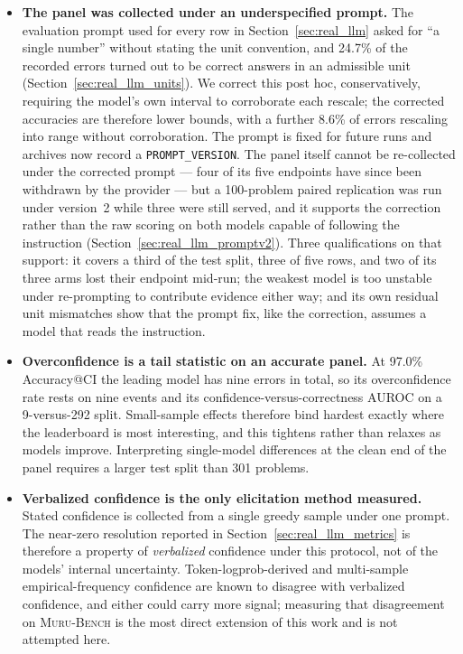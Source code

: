 \documentclass{article}
\newcommand{\muru}{\textsc{Muru-Bench}}
\begin{document}
\begin{itemize}[leftmargin=*,itemsep=3pt]
    \item \textbf{The panel was collected under an underspecified prompt.} The evaluation prompt used for every row in Section~\ref{sec:real_llm} asked for ``a single number'' without stating the unit convention, and 24.7\% of the recorded errors turned out to be correct answers in an admissible unit (Section~\ref{sec:real_llm_units}). We correct this post hoc, conservatively, requiring the model's own interval to corroborate each rescale; the corrected accuracies are therefore lower bounds, with a further 8.6\% of errors rescaling into range without corroboration. The prompt is fixed for future runs and archives now record a \texttt{PROMPT\_VERSION}. The panel itself cannot be re-collected under the corrected prompt --- four of its five endpoints have since been withdrawn by the provider --- but a 100-problem paired replication was run under version~2 while three were still served, and it supports the correction rather than the raw scoring on both models capable of following the instruction (Section~\ref{sec:real_llm_promptv2}). Three qualifications on that support: it covers a third of the test split, three of five rows, and two of its three arms lost their endpoint mid-run; the weakest model is too unstable under re-prompting to contribute evidence either way; and its own residual unit mismatches show that the prompt fix, like the correction, assumes a model that reads the instruction.
    \item \textbf{Overconfidence is a tail statistic on an accurate panel.} At 97.0\% Accuracy@CI the leading model has nine errors in total, so its overconfidence rate rests on nine events and its confidence-versus-correctness AUROC on a 9-versus-292 split. Small-sample effects therefore bind hardest exactly where the leaderboard is most interesting, and this tightens rather than relaxes as models improve. Interpreting single-model differences at the clean end of the panel requires a larger test split than 301 problems.
    \item \textbf{Verbalized confidence is the only elicitation method measured.} Stated confidence is collected from a single greedy sample under one prompt. The near-zero resolution reported in Section~\ref{sec:real_llm_metrics} is therefore a property of \emph{verbalized} confidence under this protocol, not of the models' internal uncertainty. Token-logprob-derived and multi-sample empirical-frequency confidence are known to disagree with verbalized confidence, and either could carry more signal; measuring that disagreement on \muru{} is the most direct extension of this work and is not attempted here.

\end{itemize}
\end{document}

